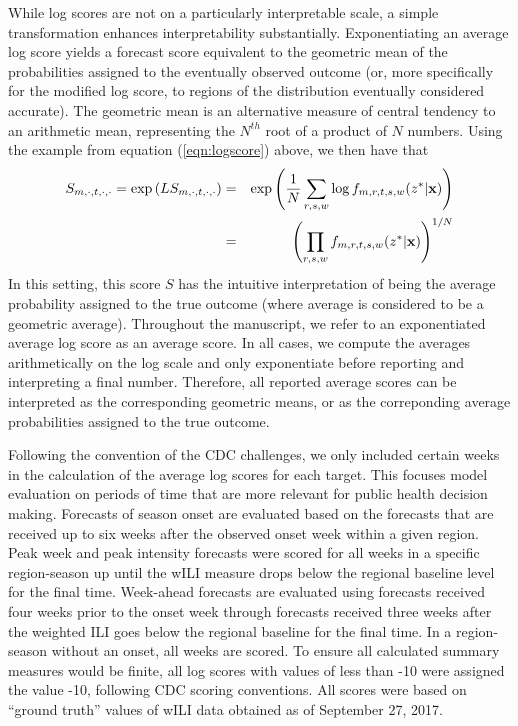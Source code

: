 \documentclass{article}\usepackage[]{graphicx}\usepackage[]{color}
\begin{document}
While log scores are not on a particularly interpretable scale, a simple transformation enhances interpretability substantially.
Exponentiating an average log score yields a forecast score equivalent to the geometric mean of the probabilities assigned to the eventually observed outcome (or, more specifically for the modified log score, to regions of the distribution eventually considered accurate). 
The geometric mean is an alternative measure of central tendency to an arithmetic mean, representing the $N^{th}$ root of a product of $N$ numbers. 
Using the example from equation (\ref{eqn:logscore}) above, we then have that
\begin{eqnarray}
S_{m,\cdot,t,\cdot,\cdot} = \exp \left ( LS_{m,\cdot,t,\cdot,\cdot} \right ) & = & \exp \left ( \frac{1}{N} \sum_{r,s,w} \log f_{m,r,t,s,w}(z^*|{\bf x}) \right ) \\
 & = & \left ( \prod_{r,s,w}  f_{m,r,t,s,w}(z^*|{\bf x}) \right ) ^{1/N} 
\end{eqnarray}
In this setting, this score $S$ has the intuitive interpretation of being the average probability assigned to the true outcome (where average is considered to be a geometric average).
Throughout the manuscript, we refer to an exponentiated average log score as an average score.
In all cases, we compute the averages arithmetically on the log scale and only exponentiate before reporting and interpreting a final number.
Therefore, all reported average scores can be interpreted as the corresponding geometric means, or as the correponding average probabilities assigned to the true outcome.

Following the convention of the CDC challenges, we only included certain weeks in the calculation of the average log scores for each target.
This focuses model evaluation on periods of time that are more relevant for public health decision making.
Forecasts of season onset are evaluated based on the forecasts that are received up to six weeks after the observed onset week within a given region.
Peak week and peak intensity forecasts were scored for all weeks in a specific region-season up until the wILI measure drops below the regional baseline level for the final time. 
Week-ahead forecasts are evaluated using forecasts received four weeks prior to the onset week through forecasts received three weeks after the weighted ILI goes below the regional baseline for the final time.
In a region-season without an onset, all weeks are scored.
To ensure all calculated summary measures would be finite, all log scores with values of less than -10 were assigned the value -10, following CDC scoring conventions.
All scores were based on ``ground truth'' values of wILI data obtained as of September 27, 2017.
\end{document}
